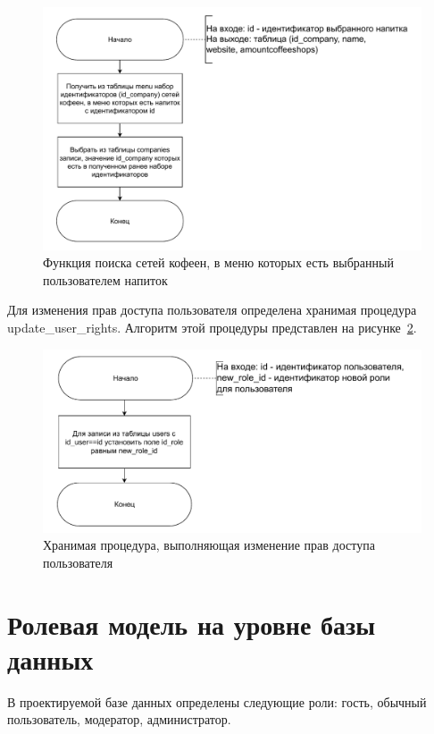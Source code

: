 \begin{figure}[H]
	\centering
	\includegraphics[width=1\linewidth]{img/func_find_companies.pdf}
	\caption{Функция поиска сетей кофеен, в меню которых есть выбранный пользователем напиток}
	\label{func_find_comp}
\end{figure}

Для изменения прав доступа пользователя определена хранимая процедура update\_user\_rights. Алгоритм этой процедуры представлен на рисунке~\ref{proc_moder}.
\begin{figure}[H]
	\centering
	\includegraphics[width=1\linewidth]{img/proc_rights.pdf}
	\caption{Хранимая процедура, выполняющая изменение прав доступа пользователя}
	\label{proc_moder}
\end{figure}


\section{Ролевая модель на уровне базы данных}
В проектируемой базе данных определены следующие роли: гость, обычный пользователь, модератор, администратор.


